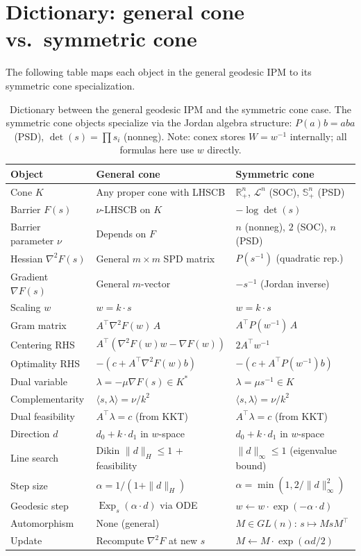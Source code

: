 \documentclass[11pt]{article}
\newcommand{\R}{\mathbb{R}}
\newcommand{\ip}[2]{\langle #1, #2 \rangle}
\DeclareMathOperator{\Exp}{Exp}
\begin{document}
\section{Dictionary: general cone vs.\ symmetric cone}

The following table maps each object in the general geodesic IPM to its
symmetric cone specialization.

\begin{table}[h]
\centering
\renewcommand{\arraystretch}{1.3}
\begin{tabular}{@{}lll@{}}
\toprule
\textbf{Object} & \textbf{General cone} & \textbf{Symmetric cone} \\
\midrule
Cone $K$ & Any proper cone with LHSCB & $\R^n_+$, $\mathcal{L}^n$ (SOC), $\mathbb{S}^n_+$ (PSD) \\
Barrier $F(s)$ & $\nu$-LHSCB on $K$ & $-\log\det(s)$ \\
Barrier parameter $\nu$ & Depends on $F$ & $n$ (nonneg), $2$ (SOC), $n$ (PSD) \\
Hessian $\nabla^2 F(s)$ & General $m \times m$ SPD matrix & $P(s^{-1})$ (quadratic rep.) \\
Gradient $\nabla F(s)$ & General $m$-vector & $-s^{-1}$ (Jordan inverse) \\
\midrule
Scaling $w$ & $w = k \cdot s$ & $w = k \cdot s$ \\
Gram matrix & $A^\top \nabla^2 F(w) \, A$ & $A^\top P(w^{-1}) \, A$ \\
Centering RHS & $A^\top(\nabla^2 F(w)w - \nabla F(w))$ & $2A^\top w^{-1}$ \\
Optimality RHS & $-(c + A^\top \nabla^2 F(w) b)$ & $-(c + A^\top P(w^{-1}) b)$ \\
\midrule
Dual variable & $\lambda = -\mu \nabla F(s) \in K^*$ & $\lambda = \mu s^{-1} \in K$ \\
Complementarity & $\ip{s}{\lambda} = \nu / k^2$ & $\ip{s}{\lambda} = \nu / k^2$ \\
Dual feasibility & $A^\top \lambda = c$ (from KKT) & $A^\top \lambda = c$ (from KKT) \\
\midrule
Direction $d$ & $d_0 + k \cdot d_1$ in $w$-space & $d_0 + k \cdot d_1$ in $w$-space \\
Line search & Dikin $\|d\|_H \leq 1$ + feasibility & $\|d\|_\infty \leq 1$ (eigenvalue bound) \\
Step size & $\alpha = 1/(1 + \|d\|_H)$ & $\alpha = \min(1, 2/\|d\|_\infty^2)$ \\
\midrule
Geodesic step & $\Exp_s(\alpha \cdot d)$ via ODE & $w \gets w \cdot \exp(-\alpha \cdot d)$ \\
Automorphism & None (general) & $M \in GL(n)$: $s \mapsto MsM^\top$ \\
Update & Recompute $\nabla^2 F$ at new $s$ & $M \gets M \cdot \exp(\alpha d / 2)$ \\
\bottomrule
\end{tabular}
\caption{Dictionary between the general geodesic IPM and the symmetric cone case.
The symmetric cone objects specialize via the Jordan algebra structure:
$P(a)b = aba$ (PSD), $\det(s) = \prod s_i$ (nonneg).
Note: conex stores $W = w^{-1}$ internally; all formulas here use $w$ directly.}
\label{tab:dictionary}
\end{table}
\end{document}
